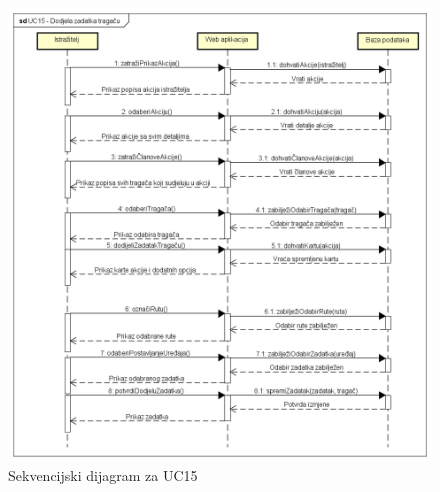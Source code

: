 \begin{packed_item}
\begin{packed_item}
				\eject
				
				\begin{figure}[H]
					\includegraphics[scale=0.6]{dijagrami/UC15-Dodjela zadatka tragaču} 
					\centering
					\caption{Sekvencijski dijagram za UC15}
					\label{fig:promjene}
				\end{figure}
				
				\eject
				
				

\end{packed_item}
\end{packed_item}
